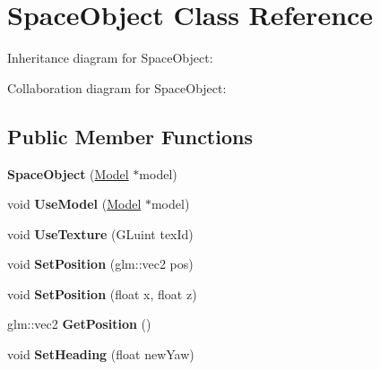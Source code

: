\hypertarget{class_space_object}{\section{Space\-Object Class Reference}
\label{class_space_object}
}


Inheritance diagram for Space\-Object\-:


Collaboration diagram for Space\-Object\-:
\subsection*{Public Member Functions}
\begin{DoxyCompactItemize}
\item 
\hypertarget{class_space_object_a3d1151b04cfde3db155ba383be752c5c}{{\bfseries Space\-Object} (\hyperlink{class_model}{Model} $\ast$model)}\label{class_space_object_a3d1151b04cfde3db155ba383be752c5c}

\item 
\hypertarget{class_space_object_a500fca0ea6e7dfc84daa7d8d40256320}{void {\bfseries Use\-Model} (\hyperlink{class_model}{Model} $\ast$model)}\label{class_space_object_a500fca0ea6e7dfc84daa7d8d40256320}

\item 
\hypertarget{class_space_object_af91714108fa4c5cd1f360611aae26c23}{void {\bfseries Use\-Texture} (G\-Luint tex\-Id)}\label{class_space_object_af91714108fa4c5cd1f360611aae26c23}

\item 
\hypertarget{class_space_object_ad1bab125aa82fe3d0fd0de2537ba191d}{void {\bfseries Set\-Position} (glm\-::vec2 pos)}\label{class_space_object_ad1bab125aa82fe3d0fd0de2537ba191d}

\item 
\hypertarget{class_space_object_af2c22343de7c323423a6420aaaef8555}{void {\bfseries Set\-Position} (float x, float z)}\label{class_space_object_af2c22343de7c323423a6420aaaef8555}

\item 
\hypertarget{class_space_object_a3b64057e04076929255e17f92d4354db}{glm\-::vec2 {\bfseries Get\-Position} ()}\label{class_space_object_a3b64057e04076929255e17f92d4354db}

\item 
\hypertarget{class_space_object_aee0b9092c654a3061b71a22896fa1383}{void {\bfseries Set\-Heading} (float new\-Yaw)}\label{class_space_object_aee0b9092c654a3061b71a22896fa1383}


\end{DoxyCompactItemize}
